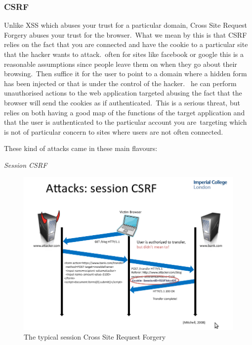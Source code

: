 \documentclass[a4paper,12pt]{paper}
\begin{document}
\subsubsection{CSRF}
\label{subsubsec:crsf}

Unlike XSS which abuses your trust for a particular domain, Cross Site Request Forgery abuses your trust for the browser.\
What we mean by this is that CSRF relies on the fact that you are connected and have the cookie to a particular site that the hacker wants to attack.\
often for sites like facebook or google this is a reasonable assumptions since people leave them on when they go about their browsing.\ Then suffice it for the user
to point to a domain where a hidden form has been injected or that is under the control of the hacker. \
he can perform unauthorised actions to the web application targeted abusing the fact that the browser will send the cookies as if authenticated.\
This is a serious threat, but relies on both having a good map of the functions of the target application and that the user is authenticated to the particular account you are\
targeting which is not of particular concern to sites where users are not often connected.\

These kind of attacks came in these main flavours:

\emph{Session CSRF}

\begin{figure}
\centering
\includegraphics[width=1\textwidth]{./sessioncsrf.png}
\caption{\label{fig:sessioncsrf}The typical session Cross Site Request Forgery}	
\end{figure}
\end{document}
